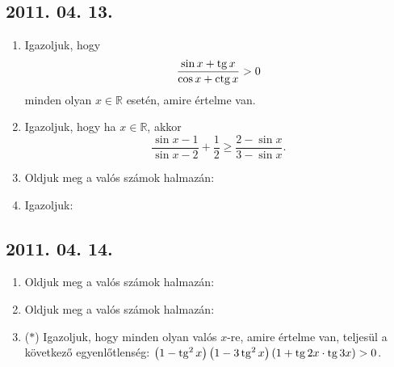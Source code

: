 \subsection*{2011. 04. 13.}
\begin{enumerate}
\item Igazoljuk, hogy \[\frac{\sin x+\mathop{\mathrm{tg}}\nolimits x}{\cos x+\mathop{\mathrm{ctg}}\nolimits x}>0\] minden olyan $x\in\mathbb R$ esetén, amire értelme van.
\item Igazoljuk, hogy ha $x\in\mathbb R$, akkor \[\frac{\sin x-1}{\sin x-2}+\frac12\ge\frac{2-\sin x}{3-\sin x}.\]
\item Oldjuk meg a valós számok halmazán:
\item Igazoljuk:
\end{enumerate}

\subsection*{2011. 04. 14.}
\begin{enumerate}
\item Oldjuk meg a valós számok halmazán:
\item Oldjuk meg a valós számok halmazán:
\item ($*$) Igazoljuk, hogy minden olyan valós $x$-re, amire értelme van, teljesül a következő egyenlőtlenség: $\left(1-\mathop{\mathrm{tg}}\nolimits^2 x\right)\left(1-3\mathop{\mathrm{tg}}\nolimits^2 x\right)\left(1+\mathop{\mathrm{tg}}\nolimits 2x\cdot\mathop{\mathrm{tg}}\nolimits 3x\right)>0$.
\end{enumerate}

